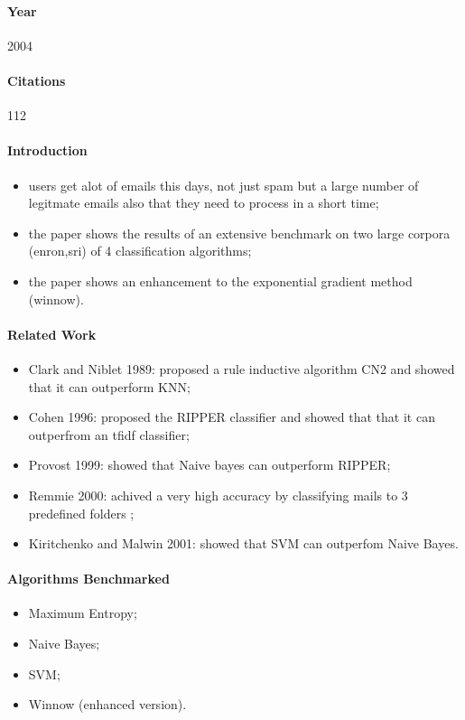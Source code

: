 \documentclass[12pt]{article}
\begin{document}
\paragraph{Year} 2004
\paragraph{Citations} 112
\paragraph{Introduction}
\begin{itemize}
  \item users get alot of emails this days, not just spam but a large number of 
	legitmate emails also that they need to process in a short time;
  \item the paper shows the results of an extensive benchmark on two large corpora 
	(enron,sri) of 4 classification algorithms;
  \item the paper shows an enhancement to the exponential gradient method (winnow).
\end{itemize}

\paragraph{Related Work}
\begin{itemize}
  \item Clark and Niblet 1989: proposed a rule inductive algorithm CN2 and 
	showed that it can outperform KNN;
  \item Cohen 1996: proposed the RIPPER classifier and showed that that it 
	can outperfrom an tfidf classifier;
  \item Provost 1999: showed that Naive bayes can outperform RIPPER;
  \item Remmie 2000: achived a very high accuracy by classifying mails to 
	3 predefined folders ;
  \item Kiritchenko and Malwin 2001: showed that SVM can outperfom Naive Bayes.
\end{itemize}


\paragraph{Algorithms Benchmarked}
\begin{itemize}
  \item Maximum Entropy;
  \item Naive Bayes;
  \item SVM;
  \item Winnow (enhanced version).
\end{itemize}
\end{document}
